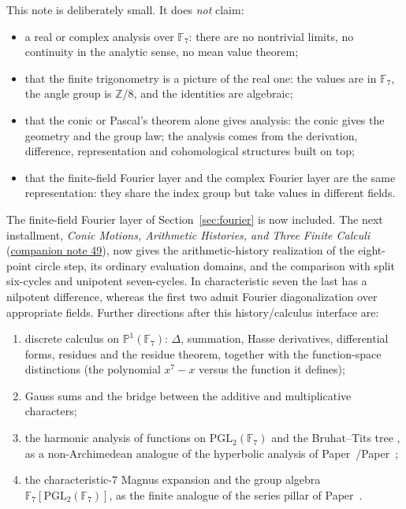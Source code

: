 \documentclass[11pt]{article}
\theoremstyle{definition}
\theoremstyle{remark}
\newcommand{\F}{\mathbb{F}}
\newcommand{\Z}{\mathbb{Z}}
\begin{document}
This note is deliberately small.  It does \emph{not} claim:
\begin{itemize}
  \item a real or complex analysis over $\F_7$: there are no nontrivial limits,
        no continuity in the analytic sense, no mean value theorem;
  \item that the finite trigonometry is a picture of the real one: the values
        are in $\F_7$, the angle group is $\Z/8$, and the identities are
        algebraic;
  \item that the conic or Pascal's theorem alone gives analysis: the conic gives
        the geometry and the group law; the analysis comes from the derivation,
        difference, representation and cohomological structures built on top;
  \item that the finite-field Fourier layer and the complex Fourier layer are
        the same representation: they share the index group but take values in
        different fields.
\end{itemize}

The finite-field Fourier layer of Section~\ref{sec:fourier} is now included.
The next installment, \emph{Conic Motions, Arithmetic Histories, and Three
Finite Calculi} (\href{49-conic-histories-and-finite-calculi.pdf}{companion note 49}), now gives the
arithmetic-history realization of the eight-point circle step, its ordinary
evaluation domains, and the comparison with split six-cycles and unipotent
seven-cycles.  In characteristic seven the last has a nilpotent difference,
whereas the first two admit Fourier diagonalization over appropriate fields.
Further directions after this history/calculus interface are:
\begin{enumerate}
  \item discrete calculus on $\mathbb P^1(\F_7)$: $\Delta$, summation, Hasse
        derivatives, differential forms, residues and the residue theorem,
        together with the function-space distinctions (the polynomial
        $x^7-x$ versus the function it defines);
  \item Gauss sums and the bridge between the additive and multiplicative
        characters;
  \item the harmonic analysis of functions on $\mathrm{PGL}_2(\F_7)$ and the
        Bruhat--Tits tree \cite{Serre}, as a non-Archimedean analogue of the
        hyperbolic analysis of Paper~\cite{Paper0}/Paper~\cite{Paper1};
  \item the characteristic-$7$ Magnus expansion and the group algebra
        $\F_7[\mathrm{PGL}_2(\F_7)]$, as the finite analogue of the series
        pillar of Paper~\cite{Paper1}.
\end{enumerate}
\end{document}

